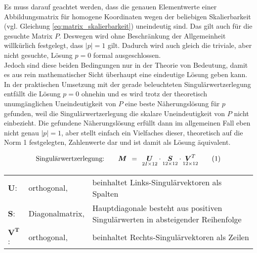 {\noindent}Es muss darauf geachtet werden, dass die genauen Elementwerte einer Abbildungsmatrix für homogene Koordinaten wegen der beliebigen Skalierbarkeit (vgl. Gleichung \ref{eq:matrix_skalierbarkeit}) uneindeutig sind. Das gilt auch für die gesuchte Matrix $P$. Deswegen wird ohne Beschränkung der Allgemeinheit willkürlich festgelegt, dass $|p|=1$ gilt. Dadurch wird auch gleich die triviale, aber nicht gesuchte, Lösung $p=0$ formal ausgeschlossen.\\
Jedoch sind diese beiden Bedingungen nur in der Theorie von Bedeutung, damit es aus rein mathematischer Sicht überhaupt eine eindeutige Lösung geben kann. In der praktischen Umsetzung mit der gerade beleuchteten Singulärwertzerlegung entfällt die Lösung $p=0$ ohnehin und es wird trotz der theoretisch unumgänglichen Uneindeutigkeit von $P$ eine beste Näherungslösung für $p$ gefunden, weil die Singulärwertzerlegung die skalare Uneindeutigkeit von $P$ nicht einbezieht. Die gefundene Näherungslösung erfüllt dann im allgemeinen Fall eben nicht genau $|p|=1$, aber stellt einfach ein Vielfaches dieser, theoretisch auf die Norm 1 festgelegten, Zahlenwerte dar und ist damit als Lösung äquivalent.\kleinerabstand

\begin{mdframed}[linewidth=1pt,leftmargin=1cm,rightmargin=1cm]
	\begin{equation}\label{eq:singulärwertzerlegung}
		\text{Singulärwertzerlegung:}\qquad \boldsymbol{M} {\:\:}={\:\:} \underset{2I{\times}12}{\boldsymbol{U}} {\:\cdot\:} \underset{12{\times}12}{\boldsymbol{S}} {\:\cdot\:} \underset{12{\times}12}{\boldsymbol{V}^T} \numberthisequation
	\end{equation}
	\begin{center}
		\begin{tabularx}{\linewidth}{l l X}
			$\boldsymbol{U}$: & orthogonal, & beinhaltet Links-Singulärvektoren als Spalten\\
			$\boldsymbol{S}$: & Diagonalmatrix, & Hauptdiagonale besteht aus positiven Singulärwerten in absteigender Reihenfolge\\
			$\boldsymbol{V^T}$: & orthogonal, & beinhaltet Rechts-Singulärvektoren als Zeilen\\
		\end{tabularx}
	\end{center}
\end{mdframed}\kleinerabstand

